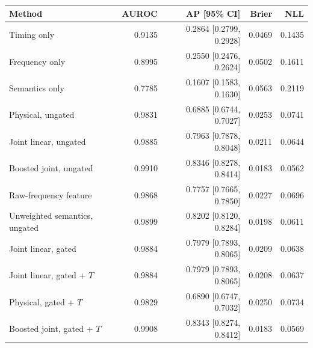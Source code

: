\begin{tabularx}{\linewidth}{@{}Yrrrr@{}}
\toprule
Method & AUROC & AP [95\% CI] & Brier & NLL \\
\midrule
Timing only & 0.9135 & 0.2864 [0.2799, 0.2928] & 0.0469 & 0.1435 \\
Frequency only & 0.8995 & 0.2550 [0.2476, 0.2624] & 0.0502 & 0.1611 \\
Semantics only & 0.7785 & 0.1607 [0.1583, 0.1630] & 0.0563 & 0.2119 \\
Physical, ungated & 0.9831 & 0.6885 [0.6744, 0.7027] & 0.0253 & 0.0741 \\
Joint linear, ungated & 0.9885 & 0.7963 [0.7878, 0.8048] & 0.0211 & 0.0644 \\
Boosted joint, ungated & 0.9910 & 0.8346 [0.8278, 0.8414] & 0.0183 & 0.0562 \\
Raw-frequency feature & 0.9868 & 0.7757 [0.7665, 0.7850] & 0.0227 & 0.0696 \\
Unweighted semantics, ungated & 0.9899 & 0.8202 [0.8120, 0.8284] & 0.0198 & 0.0611 \\
Joint linear, gated & 0.9884 & 0.7979 [0.7893, 0.8065] & 0.0209 & 0.0638 \\
Joint linear, gated + $T$ & 0.9884 & 0.7979 [0.7893, 0.8065] & 0.0208 & 0.0637 \\
Physical, gated + $T$ & 0.9829 & 0.6890 [0.6747, 0.7032] & 0.0250 & 0.0734 \\
Boosted joint, gated + $T$ & 0.9908 & 0.8343 [0.8274, 0.8412] & 0.0183 & 0.0569 \\
\bottomrule
\end{tabularx}
